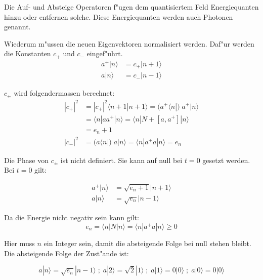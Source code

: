 Die Auf- und Absteige Operatoren f"ugen dem quantisiertem Feld Energiequanten hinzu oder entfernen solche. Diese Energiequanten werden auch Photonen genannt. 

Wiederum m"ussen die neuen Eigenvektoren normalisiert werden. Daf"ur werden die Konstanten $c_+$ und $c_-$ eingef"uhrt.
\begin{equation}
\begin{split}
a^+|n\rangle &= c_+|n+1\rangle \\
a|n\rangle &= c_-|n-1\rangle
\end{split}
\end{equation}

$c_\pm$ wird folgendermassen berechnet:
\begin{equation}
\begin{split}
	|c_+|^2 &= |c_+|^2 \langle n+1 | n+1 \rangle = ( a^+ \langle n |) \; a^+ | n \rangle \\
		&= \langle n | aa^+ |n \rangle = \langle n | N + [a,a^+] |n \rangle \\
		&= e_n+1 \\
	|c_-|^2 &= 	( a \langle n |) \; a | n \rangle = \langle n | a^+a | n \rangle = e_n
\end{split}
\end{equation}

Die Phase von $c_{\pm}$ ist nicht definiert. Sie kann auf null bei $t=0$ gesetzt werden. Bei $t=0$ gilt:

\begin{equation}
\begin{split}
a^+|n\rangle &= \sqrt{e_n+1}|n+1\rangle \\
a|n\rangle &= \sqrt{e_n}|n-1\rangle
\end{split}
\end{equation}

Da die Energie nicht negativ sein kann gilt:
\begin{equation}
e_n = \langle n | N |n \rangle = \langle n | a^+a |n \rangle \geq 0
\end{equation}

Hier muss $n$ ein Integer sein, damit die absteigende Folge bei null stehen bleibt. Die absteigende Folge der Zust"ande ist:

\begin{equation}
a|n\rangle = \sqrt{e_n}|n-1\rangle \; ; \; a|2\rangle = \sqrt{2}|1\rangle \; ; \; a|1\rangle = 0|0\rangle \; ; \; a|0\rangle = 0|0\rangle
\end{equation}

